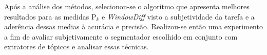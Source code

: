 Após a análise dos métodos, selecionou-se o algoritmo que apresenta melhores resultados para as medidas P$_k$ e \textit{WindowDiff} visto a subjetividade da tarefa e a aderência dessas medias à acurácia e precisão. Realizou-se então uma experimento a fim de avaliar subjetivamente o segmentador escolhido em conjunto com extratores de tópicos e analisar essas técnicas.










